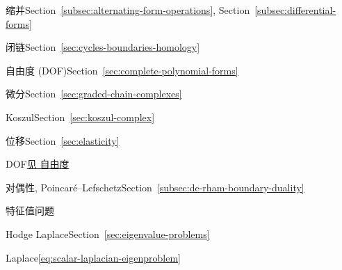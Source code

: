 \begin{theindex}
\item {}\label{index:contraction}{缩并}\quad Section~\ref{subsec:alternating-form-operations}, Section~\ref{subsec:differential-forms}

\item {}\label{index:cycle}{闭链}\quad Section~\ref{sec:cycles-boundaries-homology}

\item {}\label{index:degree-of-freedom-dof}{自由度 (DOF)}\quad Section~\ref{sec:complete-polynomial-forms}

\item {}\label{index:differential}{微分}\quad Section~\ref{sec:graded-chain-complexes}

\subitem {}\label{index:differential-koszul}{Koszul}\quad Section~\ref{sec:koszul-complex}

\item {}\label{index:displacement}{位移}\quad Section~\ref{sec:elasticity}

\item {}\label{index:dof}{DOF}\quad \hyperref[index:degree-of-freedom-dof]{{见 自由度}}

\item {}\label{index:duality-poincar-lefschetz}{对偶性, Poincaré–Lefschetz}\quad Section~\ref{subsec:de-rham-boundary-duality}

\item {}\label{index:eigenvalue-problem}{特征值问题}

\subitem {}\label{index:eigenvalue-problem-hodge-laplace}{Hodge Laplace}\quad Section~\ref{sec:eigenvalue-problems}

\subitem {}\label{index:eigenvalue-problem-laplace}{Laplace}\quad \eqref{eq:scalar-laplacian-eigenproblem}


\end{theindex}
